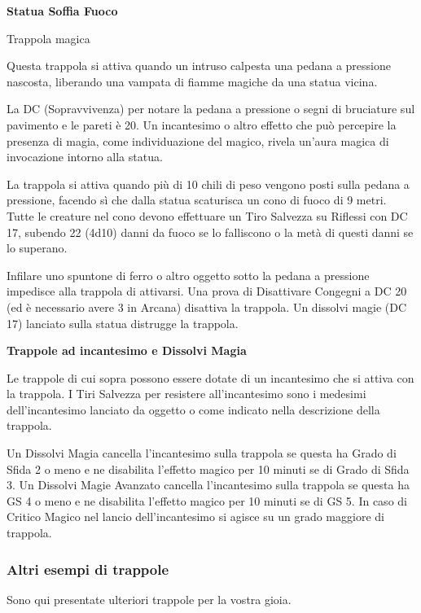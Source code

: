 \begin{multicols}{2}
\medskip

\textbf{Statua Soffia Fuoco}

Trappola magica

Questa trappola si attiva quando un intruso calpesta una pedana a pressione nascosta, liberando una vampata di fiamme magiche da una statua vicina.

La DC (Sopravvivenza) per notare la pedana a pressione o segni di bruciature sul pavimento e le pareti è 20. Un incantesimo o altro effetto che può percepire la presenza di magia, come individuazione del magico, rivela un'aura magica di invocazione intorno alla statua.

La trappola si attiva quando più di 10 chili di peso vengono posti sulla pedana a pressione, facendo sì che dalla statua scaturisca un cono di fuoco di 9 metri. Tutte le creature nel cono devono effettuare un Tiro Salvezza su Riflessi con DC 17, subendo 22 (4d10) danni da fuoco se lo falliscono o la metà di questi danni se lo superano.

Infilare uno spuntone di ferro o altro oggetto sotto la pedana a pressione impedisce alla trappola di attivarsi. Una prova di Disattivare Congegni a DC 20 (ed è necessario avere 3 in Arcana) disattiva la trappola. Un dissolvi magie (DC 17) lanciato sulla statua distrugge la trappola.


\medskip

\textbf{Trappole ad incantesimo e Dissolvi Magia}

Le trappole di cui sopra possono essere dotate di un incantesimo che si attiva con la trappola.
I Tiri Salvezza per resistere all'incantesimo sono i medesimi dell'incantesimo lanciato da oggetto o come indicato nella descrizione della trappola.

Un Dissolvi Magia cancella l'incantesimo sulla trappola se questa ha Grado di Sfida 2 o meno e ne disabilita l'effetto magico per 10 minuti se di Grado di Sfida 3.
Un Dissolvi Magie Avanzato cancella l'incantesimo sulla trappola se questa ha GS 4 o meno e ne disabilita l'effetto magico per 10 minuti se di GS 5. In caso di Critico Magico nel lancio dell'incantesimo si agisce su un grado maggiore di trappola.


\subsubsection{Altri esempi di trappole}

Sono qui presentate ulteriori trappole per la vostra gioia.



\end{multicols}
